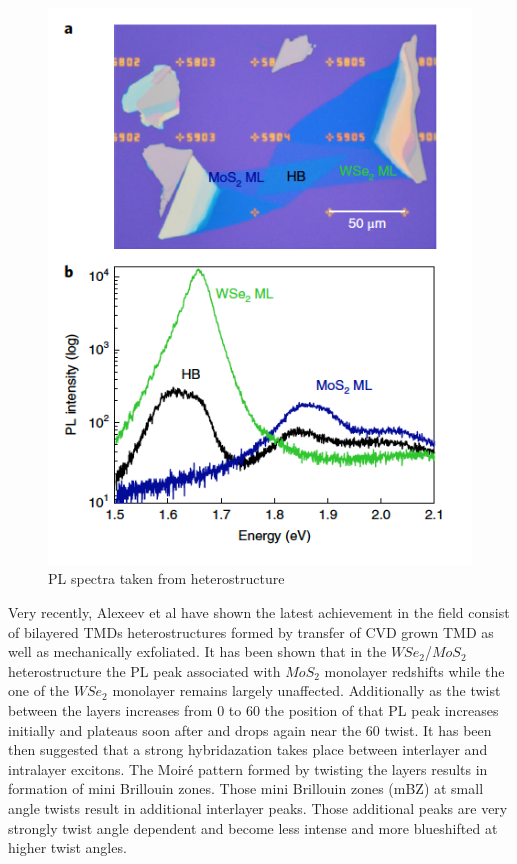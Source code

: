\begin{figure}[h]
	\begin{center}
		\includegraphics[scale=1]{Heterostructures/HeterostructurePLSpectrumInterlayerIntro.png}
		\caption{PL spectra taken from heterostructure \cite{Kunstmann2018}}
		\label{fig:HeterostructurePLSpectrumInterlayerIntro}
	\end{center}
\end{figure}

Very recently, Alexeev et al \cite{Alexeev2019} have shown the latest achievement in the field consist of bilayered TMDs heterostructures formed by transfer of CVD grown TMD as well as mechanically exfoliated. It has been shown that in the $WSe_2$/$MoS_2$ heterostructure the PL peak associated with $MoS_2$ monolayer redshifts while the one of the $WSe_2$ monolayer remains largely unaffected. Additionally as the twist between the layers increases from 0{\degree} to 60{\degree} the position of that PL peak increases initially and plateaus soon after and drops again near the 60{\degree} twist. It has been then suggested that a strong hybridazation takes place between interlayer and intralayer excitons. The Moir\'{e} pattern formed by twisting the layers results in formation of mini Brillouin zones. Those mini Brillouin zones (mBZ) at small angle twists result in additional interlayer peaks.  Those additional peaks are very strongly twist angle dependent and become less intense and more blueshifted at higher twist angles. 

